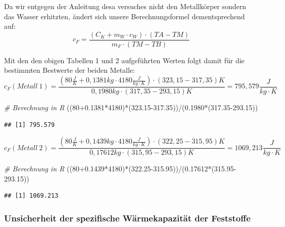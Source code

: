 \documentclass[class=article, crop=false]{standalone}
\newenvironment{Shaded}{\begin{snugshade}}{\end{snugshade}}
\newcommand{\CommentTok}[1]{\textcolor[rgb]{0.56,0.35,0.01}{\textit{#1}}}
\newcommand{\DecValTok}[1]{\textcolor[rgb]{0.00,0.00,0.81}{#1}}
\newcommand{\FloatTok}[1]{\textcolor[rgb]{0.00,0.00,0.81}{#1}}
\newcommand{\NormalTok}[1]{#1}
\newcommand{\SpecialCharTok}[1]{\textcolor[rgb]{0.00,0.00,0.00}{#1}}
\begin{document}
Da wir entgegen der Anleitung desa versuches nicht den Metallkörper
sondern das Wasser erhitzten, ändert sich unsere Berechnungsformel
dementsprechend auf: \begin{equation}\label{Kaloriemeter:c_F}
c_F = \frac{(C_K + m_W\cdot c_W)\cdot  (TA-TM) }{m_F\cdot(TM-TB)}
\end{equation}

Mit den den obigen Tabellen 1 und 2 aufgeführten Werten folgt damit für
die bestimmten Bestwerte der beiden Metalle:
\[c_F(Metall\ 1) = \frac{(80\frac{J}{K}+0,1381kg\cdot 4180\frac{J}{kg\cdot K})\cdot (323,15-317,35) K}{0,1980kg\cdot(317,35-293,15)K}= 795,579\frac{J}{kg\cdot K}\]

\begin{Shaded}
\begin{Highlighting}[]
\CommentTok{\# Berechnung in R}
\NormalTok{((}\DecValTok{80}\FloatTok{+0.1381}\SpecialCharTok{*}\DecValTok{4180}\NormalTok{)}\SpecialCharTok{*}\NormalTok{(}\FloatTok{323.15{-}317.35}\NormalTok{))}\SpecialCharTok{/}\NormalTok{(}\FloatTok{0.1980}\SpecialCharTok{*}\NormalTok{(}\FloatTok{317.35{-}293.15}\NormalTok{))}
\end{Highlighting}
\end{Shaded}

\begin{verbatim}
## [1] 795.579
\end{verbatim}

\[c_F(Metall\ 2) = \frac{(80\frac{J}{K}+0,1439kg\cdot 4180\frac{J}{kg\cdot K})\cdot (322,25-315,95) K}{0,17612kg\cdot(315,95-293,15)K}= 1069,213\frac{J}{kg\cdot K}\]

\begin{Shaded}
\begin{Highlighting}[]
\CommentTok{\# Berechnung in R}
\NormalTok{((}\DecValTok{80}\FloatTok{+0.1439}\SpecialCharTok{*}\DecValTok{4180}\NormalTok{)}\SpecialCharTok{*}\NormalTok{(}\FloatTok{322.25{-}315.95}\NormalTok{))}\SpecialCharTok{/}\NormalTok{(}\FloatTok{0.17612}\SpecialCharTok{*}\NormalTok{(}\FloatTok{315.95{-}293.15}\NormalTok{))}
\end{Highlighting}
\end{Shaded}

\begin{verbatim}
## [1] 1069.213
\end{verbatim}

\hypertarget{unsicherheit-der-spezifische-wuxe4rmekapazituxe4t-der-feststoffe}{%
\subsubsection{Unsicherheit der spezifische Wärmekapazität der
Feststoffe}\label{unsicherheit-der-spezifische-wuxe4rmekapazituxe4t-der-feststoffe}}
\end{document}
